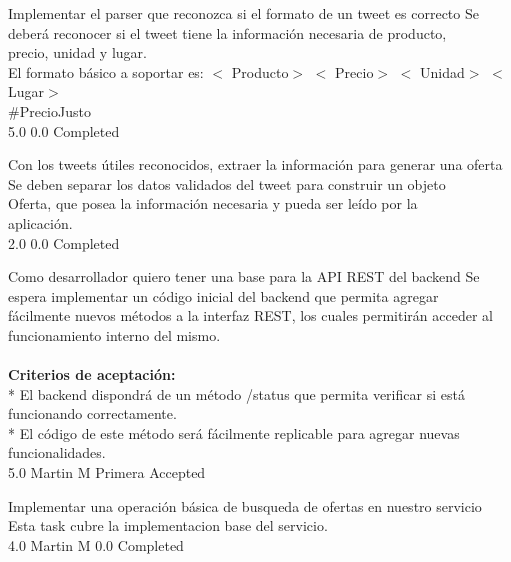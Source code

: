 		{Implementar el parser que reconozca si el formato de un tweet es correcto} %
		{Se deberá reconocer si el tweet tiene la información necesaria de producto,\\
precio, unidad y lugar.\\
El formato básico a soportar es: $<$ Producto$>$  $<$ Precio$>$  $<$ Unidad$>$  $<$ Lugar$>$ \\
\#PrecioJusto\\
} %
		{5.0} %
		{} %
		{0.0} %
		{Completed} %

		{Con los tweets útiles reconocidos, extraer la información para generar una oferta} %
		{Se deben separar los datos validados del tweet para construir un objeto\\
Oferta, que posea la información necesaria y pueda ser leído por la\\
aplicación.\\
} %
		{2.0} %
		{} %
		{0.0} %
		{Completed} %


\vspace{20pt}

	{Como desarrollador quiero tener una base para la API REST del backend} %
	{Se espera implementar un código inicial del backend que permita agregar\\
fácilmente nuevos métodos a la interfaz REST, los cuales permitirán acceder al\\
funcionamiento interno del mismo.\\
  \\
\textbf{Criterios de aceptación:}\\
* El backend dispondrá de un método /status que permita verificar si está funcionando correctamente.   \\
* El código de este método será fácilmente replicable para agregar nuevas funcionalidades.\\
} %
	{} %
	{5.0} %
	{Martin M} %
	{Primera} %
	{Accepted} %

		{Implementar una operación básica de busqueda de ofertas en nuestro servicio} %
		{Esta task cubre la implementacion base del servicio.\\
} %
		{4.0} %
		{Martin M} %
		{0.0} %
		{Completed} %

